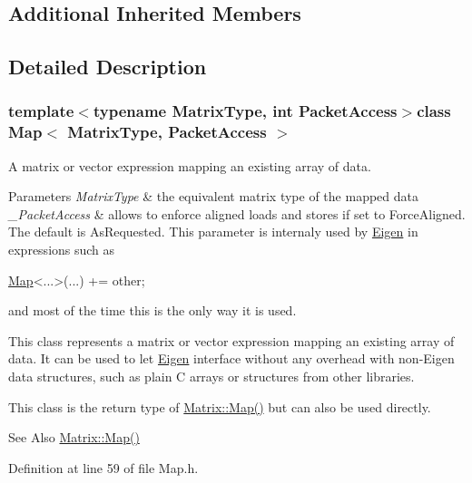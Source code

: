\subsection*{Additional Inherited Members}


\subsection{Detailed Description}
\subsubsection*{template$<$typename Matrix\-Type, int Packet\-Access$>$class Map$<$ Matrix\-Type, Packet\-Access $>$}

A matrix or vector expression mapping an existing array of data. 


\begin{DoxyParams}{Parameters}
{\em Matrix\-Type} & the equivalent matrix type of the mapped data \\
\hline
{\em \-\_\-\-Packet\-Access} & allows to enforce aligned loads and stores if set to Force\-Aligned. The default is As\-Requested. This parameter is internaly used by \hyperlink{namespace_eigen}{Eigen} in expressions such as
\begin{DoxyCode}
\hyperlink{class_map}{Map}<...>(...) += other; 
\end{DoxyCode}
 and most of the time this is the only way it is used.\\
\hline
\end{DoxyParams}
This class represents a matrix or vector expression mapping an existing array of data. It can be used to let \hyperlink{namespace_eigen}{Eigen} interface without any overhead with non-\/\-Eigen data structures, such as plain C arrays or structures from other libraries.

This class is the return type of \hyperlink{class_matrix_a23e7b4c1536f9809b1062e5c95838df2}{Matrix\-::\-Map()} but can also be used directly.

\begin{DoxySeeAlso}{See Also}
\hyperlink{class_matrix_a23e7b4c1536f9809b1062e5c95838df2}{Matrix\-::\-Map()} 
\end{DoxySeeAlso}


Definition at line 59 of file Map.\-h.



